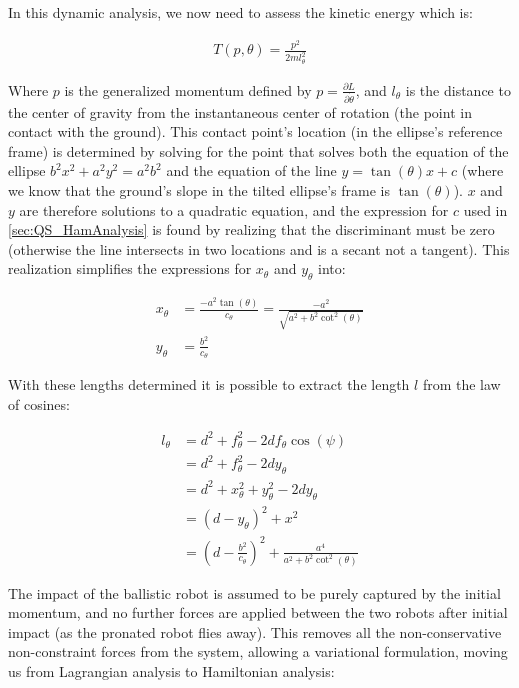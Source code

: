 \documentclass[letterpaper]{report}
\begin{document}
In this dynamic analysis, we now need to assess the kinetic energy which is:

\begin{align}
  T(p,\theta) = \frac{p^2}{2ml_\theta^2}
\end{align}

Where $p$ is the generalized momentum defined by $p = \frac{\partial L}{\partial \dot{\theta}}$, and $l_\theta$ is the distance to the center of gravity from the instantaneous center of rotation (the point in contact with the ground).
This contact point's location (in the ellipse's reference frame) is determined by solving for the point that solves both the equation of the ellipse $b^2 x^2 + a^2 y^2 = a^2 b^2$ and the equation of the line $y = \tan(\theta) x + c$ (where we know that the ground's slope in the tilted ellipse's frame is $\tan(\theta)$).
$x$ and $y$ are therefore solutions to a quadratic equation, and the expression for $c$ used in \ref{sec:QS_HamAnalysis} is found by realizing that the discriminant must be zero (otherwise the line intersects in two locations and is a secant not a tangent).
This realization simplifies the expressions for $x_\theta$ and $y_\theta$ into:

\begin{align}
  x_\theta &= \frac{-a^2 \tan(\theta)}{c_\theta} = \frac{-a^2}{\sqrt{a^2 + b^2 \cot^2(\theta)}}\\
  y_\theta &= \frac{b^2}{c_\theta}
\end{align}

With these lengths determined it is possible to extract the length $l$ from the law of cosines:

\begin{align}
  l_\theta &= d^2 + f_\theta^2 - 2 d f_\theta \cos(\psi) \\
  &= d^2 + f_\theta^2 - 2 d y_\theta \\
  &= d^2 + x_\theta^2 + y_\theta^2 - 2 d y_\theta \\
  &= (d - y_\theta)^2 + x^2 \\
  &= \left(d - \frac{b^2}{c_\theta}\right)^2 + \frac{a^4}{a^2 + b^2 \cot^2(\theta)}
\end{align}

The impact of the ballistic robot is assumed to be purely captured by the initial momentum, and no further forces are applied between the two robots after initial impact (as the pronated robot flies away).
This removes all the non-conservative non-constraint forces from the system, allowing a variational formulation, moving us from Lagrangian analysis to Hamiltonian analysis:
\end{document}
